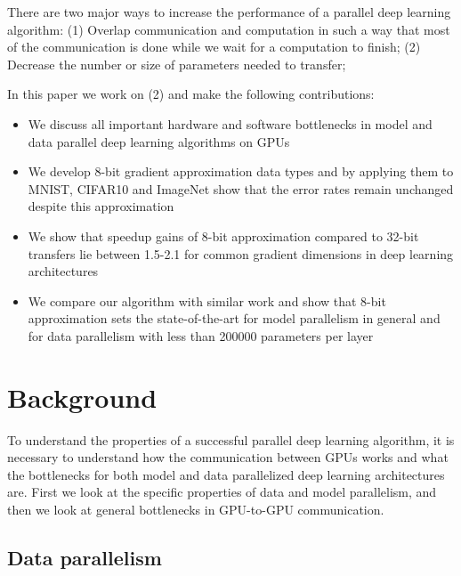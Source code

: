\documentclass{article} %
\begin{document}
There are two major ways to increase the performance of a parallel deep learning algorithm: (1) Overlap communication and computation in such a way that most of the communication is done while we wait for a computation to finish; (2) Decrease the number or size of parameters needed to transfer;

In this paper we work on (2) and make the following contributions: 
\begin{itemize}
	\item We discuss all important hardware and software bottlenecks in model and data parallel deep learning algorithms on GPUs
	\item We develop 8-bit gradient approximation data types and by applying them to MNIST, CIFAR10 and ImageNet show that the error rates remain unchanged despite this approximation
	\item We show that speedup gains of 8-bit approximation compared to 32-bit transfers lie between 1.5-2.1 for common gradient dimensions in deep learning architectures
	\item We compare our algorithm with similar work and show that 8-bit approximation sets the state-of-the-art for model parallelism in general and for data parallelism with less than 200000 parameters per layer
\end{itemize}
\section{Background}

 To understand the properties of a successful parallel deep learning algorithm, it is necessary to understand how the communication between GPUs works and what the bottlenecks for both model and data parallelized deep learning architectures are. First we look at the specific properties of data and model parallelism, and then we look at general bottlenecks in GPU-to-GPU communication.

\subsection{Data parallelism}
\end{document}
